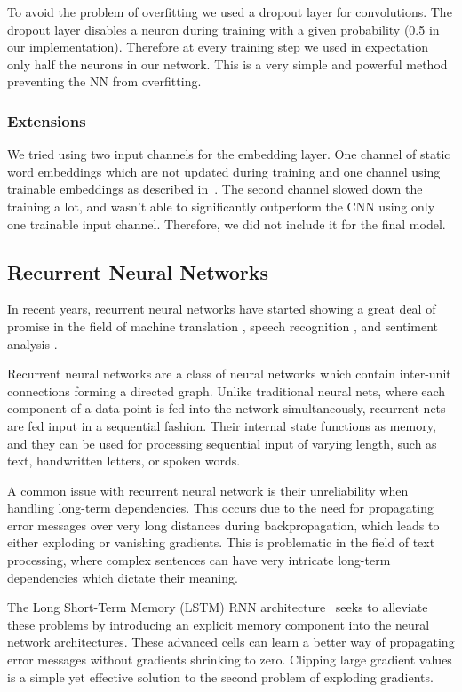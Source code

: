 \documentclass[10pt,conference,compsocconf]{IEEEtran}
\begin{document}
To avoid the problem of overfitting we used a dropout layer for convolutions.
The dropout layer disables a neuron during training with a given probability (0.5 in our implementation). Therefore at every training step we used in expectation only half the neurons in our network. This is a very simple and powerful method preventing the NN
from overfitting. 

\subsubsection{Extensions}
We tried using two input channels for the embedding layer. One channel of static word embeddings which are not updated during training and one channel using trainable embeddings as described in~\cite{kim2014convolutional}. The second channel slowed down the training a lot, and wasn't able to significantly outperform the CNN using only one trainable input channel. Therefore, we did not include it for the final model. 


\subsection{Recurrent Neural Networks}
\label{sec:rnn}

In recent years, recurrent neural networks have started showing
a great deal of promise in the field of 
machine translation \cite{sutskever2014sequence}, speech recognition
\cite{graves2013speech}, and sentiment analysis \cite{zhao2016online}. 

Recurrent neural networks are a class of neural networks which contain
inter-unit connections forming a directed graph. Unlike traditional
neural nets, where each component of a data point is fed into the network
simultaneously, recurrent nets are fed input in a sequential fashion.
Their internal state functions
as memory, and they can be used for processing sequential input of varying length,
such as text, handwritten letters, or spoken words.

A common issue with recurrent neural network is their unreliability
when handling long-term dependencies. This occurs due to the need for
propagating error messages over very long distances during backpropagation,
which leads to either exploding or vanishing gradients. This is 
problematic in the field of text processing, where complex sentences can have
very intricate long-term dependencies which dictate their meaning.

The Long Short-Term Memory (LSTM) RNN architecture~\cite{hochreiter1997lstm}
seeks to alleviate these problems by introducing an explicit memory
component into the neural network architectures. These advanced cells can
learn a better way of propagating error messages without gradients shrinking to zero.
Clipping large gradient values is a simple yet effective solution to the second
problem of exploding gradients.
\end{document}
